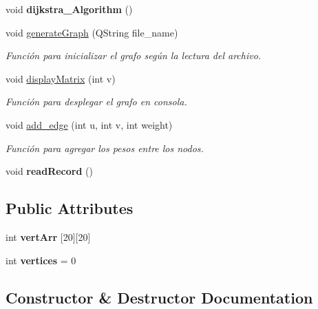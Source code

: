 \begin{DoxyCompactItemize}
\mbox{\label{classGraph_a1a003c8b7e4fee160f8ec16911e3a901}} 
void {\bfseries dijkstra\+\_\+\+Algorithm} ()
\item 
void \hyperlink{classGraph_a7eca1a461b123474671c2b785ac335ce}{generate\+Graph} (Q\+String file\+\_\+name)
\begin{DoxyCompactList}\small\item\em Función para inicializar el grafo según la lectura del archivo. \end{DoxyCompactList}\item 
void \hyperlink{classGraph_ade26593d4c45992cf9fd3f017129179f}{display\+Matrix} (int v)
\begin{DoxyCompactList}\small\item\em Función para desplegar el grafo en consola. \end{DoxyCompactList}\item 
void \hyperlink{classGraph_a831e3a8fae52181ce7051848cfcc3e53}{add\+\_\+edge} (int u, int v, int weight)
\begin{DoxyCompactList}\small\item\em Función para agregar los pesos entre los nodos. \end{DoxyCompactList}\item 
\mbox{\label{classGraph_a57260bcca8d822e8ee546dbf02485b53}} 
void {\bfseries read\+Record} ()
\end{DoxyCompactItemize}
\subsection*{Public Attributes}
\begin{DoxyCompactItemize}
\item 
\mbox{\label{classGraph_ab5fcdaf2ecd8a4fd72b7e99b490bc610}} 
int {\bfseries vert\+Arr} \mbox{[}20\mbox{]}\mbox{[}20\mbox{]}
\item 
\mbox{\label{classGraph_a8d11efa4ce950a76e434618fb24b0e15}} 
int {\bfseries vertices} = 0
\end{DoxyCompactItemize}


\subsection{Constructor \& Destructor Documentation}
\mbox{\label{classGraph_a659cbdfe9bf825b899b5a8c19296718e}} 
